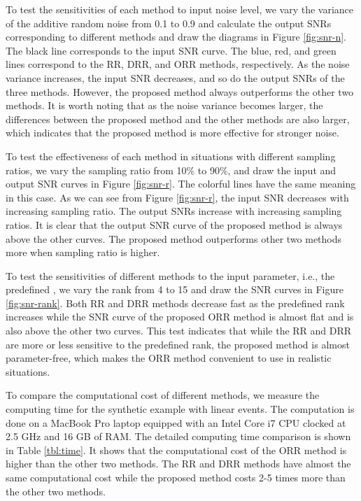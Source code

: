 To test the sensitivities of each method to input noise level, we vary the variance of the additive random noise from 0.1 to 0.9 and calculate the output SNRs corresponding to different methods and draw the diagrams in Figure \ref{fig:snr-n}. The black line corresponds to the input SNR curve. The blue, red, and green lines correspond to the RR, DRR, and ORR methods, respectively. As the noise variance increases, the input SNR decreases, and so do the output SNRs of the three methods. However, the proposed method always outperforms the other two methods. It is worth noting that as the noise variance becomes larger, the differences between the proposed method and the other methods are also larger, which indicates that the proposed method is more effective for stronger noise.

To test the effectiveness of each method in situations with different sampling ratios, we vary the sampling ratio from 10\% to 90\%, and draw the input and output SNR curves in Figure \ref{fig:snr-r}. The colorful lines have the same meaning in this case. As we can see from Figure \ref{fig:snr-r}, the input SNR decreases with increasing sampling ratio. The output SNRs increase with increasing sampling ratios. It is clear that the output SNR curve of the proposed method is always above the other curves. The proposed method outperforms other two methods more when sampling ratio is higher. 

To test the sensitivities of different methods to the input parameter, i.e., the predefined , we vary the rank from 4 to 15 and draw the SNR curves in Figure \ref{fig:snr-rank}. Both RR and DRR methods decrease fast as the predefined rank increases while the SNR curve of the proposed ORR method is almost flat and is also above the other two curves. This test indicates that while the RR and DRR are more or less sensitive to the predefined rank, the proposed method is almost parameter-free, which makes the ORR method convenient to use in realistic situations. 

To compare the computational cost of different methods, we measure the computing time for the synthetic example with linear events. The computation is done on a MacBook Pro laptop equipped with an Intel Core i7 CPU clocked at 2.5 GHz and 16 GB of RAM. The detailed computing time comparison is shown in Table \ref{tbl:time}. It shows that the computational cost of the ORR method is higher than the other two methods.  The RR and DRR methods have almost the same computational cost while the proposed method costs 2-5 times more than the other two methods. 

